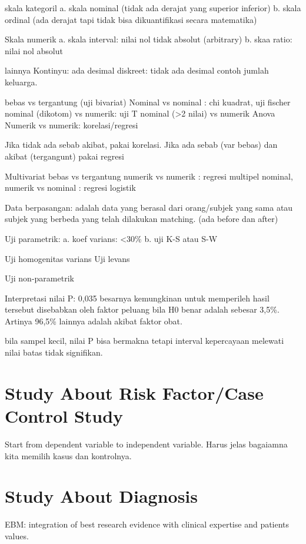 \documentclass[
  letterpaper,
  DIV=11,
  numbers=noendperiod]{scrreprt}
\begin{document}
skala kategoril a. skala nominal (tidak ada derajat yang superior
inferior) b. skala ordinal (ada derajat tapi tidak bisa dikuantifikasi
secara matematika)

Skala numerik a. skala interval: nilai nol tidak absolut (arbitrary) b.
skaa ratio: nilai nol absolut

lainnya Kontinyu: ada desimal diskreet: tidak ada desimal contoh jumlah
keluarga.

bebas vs tergantung (uji bivariat) Nominal vs nominal : chi kuadrat, uji
fischer nominal (dikotom) vs numerik: uji T nominal (\textgreater2
nilai) vs numerik Anova Numerik vs numerik: korelasi/regresi

Jika tidak ada sebab akibat, pakai korelasi. Jika ada sebab (var bebas)
dan akibat (tergangunt) pakai regresi

Multivariat bebas vs tergantung numerik vs numerik : regresi multipel
nominal, numerik vs nominal : regresi logistik

Data berpasangan: adalah data yang berasal dari orang/subjek yang sama
atau subjek yang berbeda yang telah dilakukan matching. (ada before dan
after)

Uji parametrik: a. koef varians: \textless30\% b. uji K-S atau S-W

Uji homogenitas varians Uji levans

Uji non-parametrik

Interpretasi nilai P: 0,035 besarnya kemungkinan untuk memperileh hasil
tersebut disebabkan oleh faktor peluang bila H0 benar adalah sebesar
3,5\%. Artinya 96,5\% lainnya adalah akibat faktor obat.

bila sampel kecil, nilai P bisa bermakna tetapi interval kepercayaan
melewati nilai batas tidak signifikan.

\section{Study About Risk Factor/Case Control
Study}\label{study-about-risk-factorcase-control-study}

Start from dependent variable to independent variable. Harus jelas
bagaiamna kita memilih kasus dan kontrolnya.

\section{Study About Diagnosis}\label{study-about-diagnosis}

EBM: integration of best research evidence with clinical expertise and
patients values.
\end{document}
